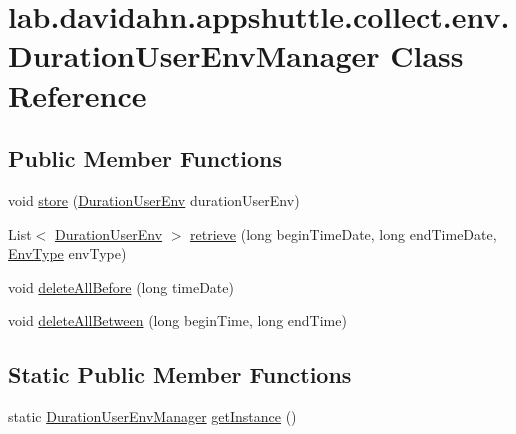 \hypertarget{classlab_1_1davidahn_1_1appshuttle_1_1collect_1_1env_1_1_duration_user_env_manager}{\section{lab.\-davidahn.\-appshuttle.\-collect.\-env.\-Duration\-User\-Env\-Manager \-Class \-Reference}
\label{classlab_1_1davidahn_1_1appshuttle_1_1collect_1_1env_1_1_duration_user_env_manager}
}
\subsection*{\-Public \-Member \-Functions}
\begin{DoxyCompactItemize}
\item 
void \hyperlink{classlab_1_1davidahn_1_1appshuttle_1_1collect_1_1env_1_1_duration_user_env_manager_a95391d68d34988671013b024e882f609}{store} (\hyperlink{classlab_1_1davidahn_1_1appshuttle_1_1collect_1_1env_1_1_duration_user_env}{\-Duration\-User\-Env} duration\-User\-Env)
\item 
\-List$<$ \hyperlink{classlab_1_1davidahn_1_1appshuttle_1_1collect_1_1env_1_1_duration_user_env}{\-Duration\-User\-Env} $>$ \hyperlink{classlab_1_1davidahn_1_1appshuttle_1_1collect_1_1env_1_1_duration_user_env_manager_a94597be6c84d11756b33c7efb9f946e0}{retrieve} (long begin\-Time\-Date, long end\-Time\-Date, \hyperlink{enumlab_1_1davidahn_1_1appshuttle_1_1collect_1_1env_1_1_env_type}{\-Env\-Type} env\-Type)
\item 
void \hyperlink{classlab_1_1davidahn_1_1appshuttle_1_1collect_1_1env_1_1_duration_user_env_manager_ad1bed436291bf2c6974cb731db5119d7}{delete\-All\-Before} (long time\-Date)
\item 
void \hyperlink{classlab_1_1davidahn_1_1appshuttle_1_1collect_1_1env_1_1_duration_user_env_manager_ae75c453265254bec8071c3d06f8ebd42}{delete\-All\-Between} (long begin\-Time, long end\-Time)
\end{DoxyCompactItemize}
\subsection*{\-Static \-Public \-Member \-Functions}
\begin{DoxyCompactItemize}
\item 
static \hyperlink{classlab_1_1davidahn_1_1appshuttle_1_1collect_1_1env_1_1_duration_user_env_manager}{\-Duration\-User\-Env\-Manager} \hyperlink{classlab_1_1davidahn_1_1appshuttle_1_1collect_1_1env_1_1_duration_user_env_manager_a5a8d696ef319e68f873be04b81f4693b}{get\-Instance} ()
\end{DoxyCompactItemize}


